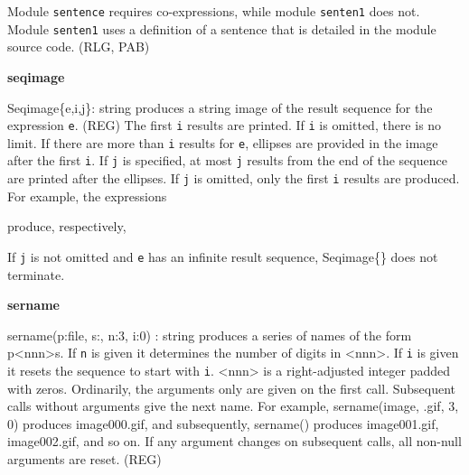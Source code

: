 Module \texttt{sentence} requires co-expressions, while module
\texttt{senten1} does not. Module \texttt{senten1} uses a definition of
a {\textquotedbl}sentence{\textquotedbl} that is detailed in the module
source code. (RLG, PAB)

{\sffamily\bfseries
seqimage}

\textsf{Seqimage\{e,i,j\}: string} produces a string image of the result
sequence for the expression \texttt{e}. (REG) The first \texttt{i}
results are printed. If \texttt{i} is omitted, there is no limit. If
there are more than \texttt{i} results for \texttt{e}, ellipses are
provided in the image after the first \texttt{i}. If \texttt{j} is
specified, at most \texttt{j} results from the end of the sequence are
printed after the ellipses. If \texttt{j} is omitted, only the first
\texttt{i} results are produced. For example, the expressions 


produce, respectively, 


If \texttt{j} is not omitted and \texttt{e} has an infinite result
sequence, \textsf{Seqimage\{\}} does not terminate.

{\sffamily\bfseries
sername}

\textsf{sername(p:{\textquotedbl}file{\textquotedbl},
s:{\textquotedbl}{\textquotedbl}, n:3, i:0) : string} produces a series
of names of the form p{\textless}nnn{\textgreater}s. If \texttt{n} is
given it determines the number of digits in
{\textless}nnn{\textgreater}. If \texttt{i} is given it resets the
sequence to start with \texttt{i}. {\textless}nnn{\textgreater} is a
right-adjusted integer padded with zeros. Ordinarily, the arguments
only are given on the first call. Subsequent calls without arguments
give the next name. For example,
\textsf{sername({\textquotedbl}image{\textquotedbl},
{\textquotedbl}.gif{\textquotedbl}, 3, 0)} produces
\textsf{{\textquotedbl}image000.gif{\textquotedbl}}, and subsequently,
\textsf{sername()} produces
\textsf{{\textquotedbl}image001.gif{\textquotedbl}},
\textsf{{\textquotedbl}image002.gif{\textquotedbl}}, and so on. If any
argument changes on subsequent calls, all non-null arguments are reset.
(REG)

